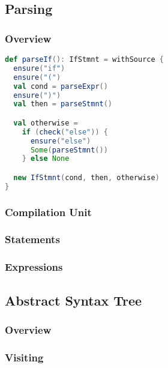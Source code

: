\documentclass{article}
\begin{document}
\subsection{Parsing}

\subsubsection{Overview}


\begin{lstlisting}[language=Scala]
def parseIf(): IfStmnt = withSource {
  ensure("if")
  ensure("(")
  val cond = parseExpr()
  ensure(")")
  val then = parseStmnt()

  val otherwise =
    if (check("else")) {
      ensure("else")
      Some(parseStmnt())
    } else None

  new IfStmnt(cond, then, otherwise)
}
\end{lstlisting}





\subsubsection{Compilation Unit}

\subsubsection{Statements}

\subsubsection{Expressions}


\subsection{Abstract Syntax Tree}

\subsubsection{Overview}

\subsubsection{Visiting}
\end{document}
